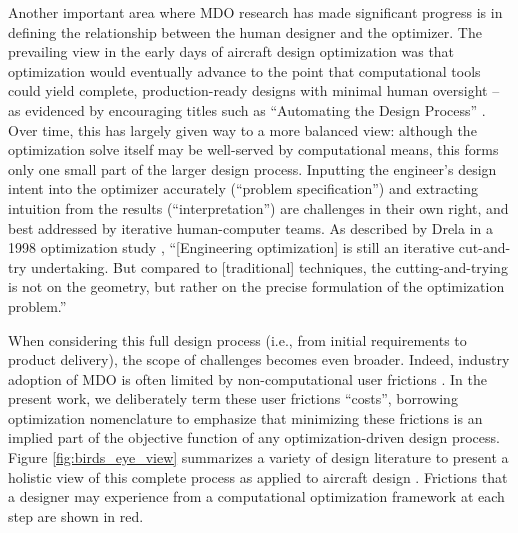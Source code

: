 \documentclass[12pt,vi,oneside,table]{report}
\begin{document}
    Another important area where MDO research has made significant progress is in defining the relationship between the human designer and the optimizer. The prevailing view in the early days of aircraft design optimization was that optimization would eventually advance to the point that computational tools could yield complete, production-ready designs with minimal human oversight -- as evidenced by encouraging titles such as ``Automating the Design Process'' \cite{heldenfels_automating_1973, heldenfels_automation_1974, vanderplaats_automated_1976}. Over time, this has largely given way to a more balanced view: although the optimization solve itself may be well-served by computational means, this forms only one small part of the larger design process. Inputting the engineer's design intent into the optimizer accurately (``problem specification'') and extracting intuition from the results (``interpretation'') are challenges in their own right, and best addressed by iterative human-computer teams. As described by Drela in a 1998 optimization study \cite{drela_pros_1998}, ``[Engineering optimization] is still an iterative cut-and-try undertaking. But compared to [traditional] techniques, the cutting-and-trying is not on the geometry, but rather on the precise formulation of the optimization problem.''

    When considering this full design process (i.e., from initial requirements to product delivery), the scope of challenges becomes even broader. Indeed, industry adoption of MDO is often limited by non-computational user frictions \cite{salas_framework_1998, gpkit, martins_engineering_2021}. In the present work, we deliberately term these user frictions ``costs'', borrowing optimization nomenclature to emphasize that minimizing these frictions is an implied part of the objective function of any optimization-driven design process. Figure \ref{fig:birds_eye_view} summarizes a variety of design literature to present a holistic view of this complete process as applied to aircraft design \cite{torenbeek_advanced_2013, martins_engineering_2021, yang_observations_2009, torenbeek_synthesis_1976, roskam_airplane_1989, nicolai_fundamentals_2010, salas_framework_1998}. Frictions that a designer may experience from a computational optimization framework at each step are shown in \textcolor[HTML]{BB5045}{red}.
\end{document}

